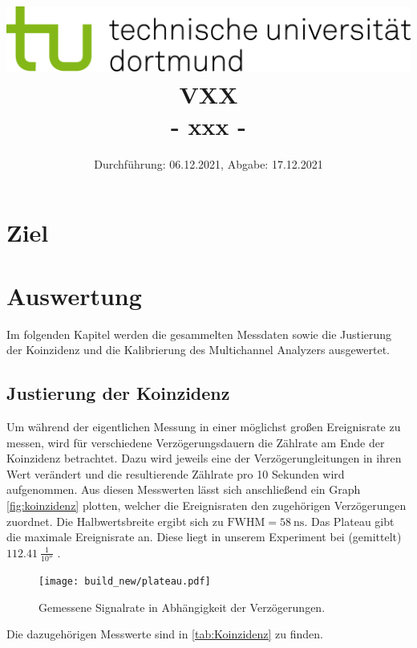 
\usepackage{romannum}
\usepackage{listings}
\lstset{numbers=left, numberstyle=\tiny, numbersep=5pt}
\lstset{language=Perl}

\title{\includegraphics[scale=0.8]{../logo.jpg} \\ \vspace*{1cm} VXX \\ - xxx -}

\date{Durchführung: 06.12.2021, Abgabe: 17.12.2021}



\maketitle

\tableofcontents
\newpage

\section{Ziel}


\section{Auswertung}
Im folgenden Kapitel werden die gesammelten Messdaten sowie die Justierung der Koinzidenz und 
die Kalibrierung des Multichannel Analyzers ausgewertet.


\subsection{Justierung der Koinzidenz}
Um während der eigentlichen Messung in einer möglichst großen Ereignisrate zu messen, wird
für verschiedene Verzögerungsdauern die Zählrate am Ende der Koinzidenz betrachtet.
Dazu wird jeweils eine der Verzögerungleitungen in ihren Wert verändert und die resultierende Zählrate pro 10 Sekunden
wird aufgenommen.
Aus diesen Messwerten lässt sich anschließend ein Graph \autoref{fig:koinzidenz} plotten, 
welcher die Ereignisraten den zugehörigen Verzögerungen zuordnet.
Die Halbwertsbreite ergibt sich zu $\text{FWHM} = \SI{58}{\nano\second}$.
Das Plateau gibt die maximale Ereignisrate an. 
Diese liegt in unserem Experiment bei (gemittelt) $\SI{112,41}{\frac{1}{10 \second}}$ .
\begin{figure}
    \centering
    \texttt{[image: build\_new/plateau.pdf]}
    \caption{Gemessene Signalrate in Abhängigkeit der Verzögerungen.}
    \label{fig:koinzidenz}
\end{figure}
\FloatBarrier
Die dazugehörigen Messwerte sind in \autoref{tab:Koinzidenz} zu finden.
\FloatBarrier

